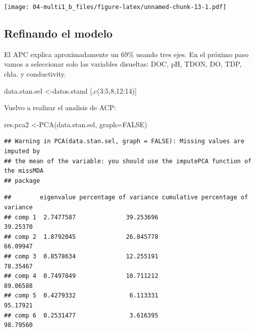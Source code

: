 \documentclass[
]{book}
\newenvironment{Shaded}{\begin{snugshade}}{\end{snugshade}}
\newcommand{\AttributeTok}[1]{\textcolor[rgb]{0.77,0.63,0.00}{#1}}
\newcommand{\CommentTok}[1]{\textcolor[rgb]{0.56,0.35,0.01}{\textit{#1}}}
\newcommand{\ConstantTok}[1]{\textcolor[rgb]{0.00,0.00,0.00}{#1}}
\newcommand{\DecValTok}[1]{\textcolor[rgb]{0.00,0.00,0.81}{#1}}
\newcommand{\FunctionTok}[1]{\textcolor[rgb]{0.00,0.00,0.00}{#1}}
\newcommand{\NormalTok}[1]{#1}
\newcommand{\OtherTok}[1]{\textcolor[rgb]{0.56,0.35,0.01}{#1}}
\newcommand{\SpecialCharTok}[1]{\textcolor[rgb]{0.00,0.00,0.00}{#1}}
\begin{document}
\texttt{[image: 04-multi1\_b\_files/figure-latex/unnamed-chunk-13-1.pdf]}

\hypertarget{refinando-el-modelo}{%
\subsection{Refinando el modelo}\label{refinando-el-modelo}}

El APC explica aproximadamente un 69\% usando tres ejes. En el próximo paso vamos a seleccionar solo las variables disueltas: DOC, pH, TDON, DO, TDP, chla. y conductivity.

\begin{Shaded}
\begin{Highlighting}[]
\NormalTok{data.stan.sel }\OtherTok{\textless{}{-}}\NormalTok{datos.stand [,}\FunctionTok{c}\NormalTok{(}\DecValTok{3}\SpecialCharTok{:}\DecValTok{5}\NormalTok{,}\DecValTok{8}\NormalTok{,}\DecValTok{12}\SpecialCharTok{:}\DecValTok{14}\NormalTok{)]}
\end{Highlighting}
\end{Shaded}

Vuelvo a realizar el analisis de ACP:

\begin{Shaded}
\begin{Highlighting}[]
\NormalTok{res.pca2 }\OtherTok{\textless{}{-}}\FunctionTok{PCA}\NormalTok{(data.stan.sel, }\AttributeTok{graph=}\ConstantTok{FALSE}\NormalTok{)}
\end{Highlighting}
\end{Shaded}

\begin{verbatim}
## Warning in PCA(data.stan.sel, graph = FALSE): Missing values are imputed by
## the mean of the variable: you should use the imputePCA function of the missMDA
## package
\end{verbatim}

\begin{Shaded}
\end{Shaded}

\begin{verbatim}
##        eigenvalue percentage of variance cumulative percentage of variance
## comp 1  2.7477587              39.253696                          39.25370
## comp 2  1.8792045              26.845778                          66.09947
## comp 3  0.8578634              12.255191                          78.35467
## comp 4  0.7497849              10.711212                          89.06588
## comp 5  0.4279332               6.113331                          95.17921
## comp 6  0.2531477               3.616395                          98.79560
\end{verbatim}
\end{document}
